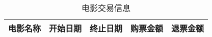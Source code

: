 \documentclass[UTF8]{ctexart}
\newcommand{\kaiti}{\CJKfamily{kaiti}}
\begin{document}
\begin{center}
    \begin{table}
        \renewcommand\arraystretch{2}
        \small
        \resizebox{\textwidth}{!}
        {
            \begin{tabular}{|c|c|c|c|c|}
                \hline
                \kaiti 电影名称 & \kaiti 开始日期 & \kaiti 终止日期 & \kaiti 购票金额 & \kaiti 退票金额 \\
                \hline
            \end{tabular}
        }

        \caption*{电影交易信息}
    \end{table}
\end{center}
\end{document}
